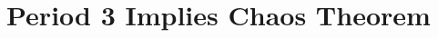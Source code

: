 \documentclass[notes]{beamer}
\begin{document}
%
%
%
%
%
%
\section[Period 3 Proof ]{Period 3 Implies Chaos Theorem}
\end{document}

